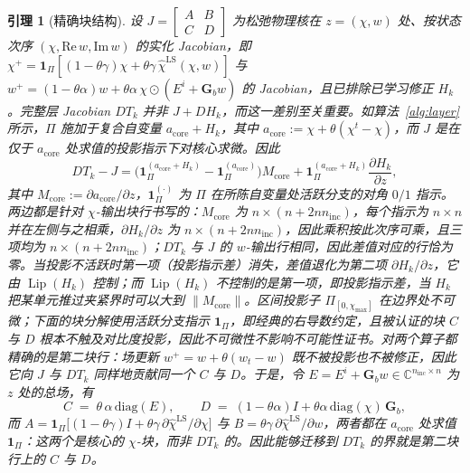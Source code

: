 \documentclass[UTF8,a4paper,11pt]{ctexart}
\newcommand{\C}{\mathbb{C}}
\newcommand{\norm}[1]{\lVert #1 \rVert}
\newtheorem{Lemma}{引理}[section]
\begin{document}
\begin{Lemma}[精确块结构]\label{lem:blocks}
设 $J=\left[\begin{smallmatrix}A&B\\ C&D\end{smallmatrix}\right]$ 为\emph{松弛物理核}在
$z=(\chi,w)$ 处、按状态次序 $(\chi,\mathrm{Re}\,w,\mathrm{Im}\,w)$ 的实化 Jacobian，即
$\chi^{+}=\mathbf{1}_{\Pi}[(1-\theta\gamma)\chi+\theta\gamma\,\hat\chi^{\mathrm{LS}}(\chi,w)]$
与 $w^{+}=(1-\theta\alpha)w+\theta\alpha\,\chi\odot(E^{i}+\mathbf{G}_b w)$ 的 Jacobian，\emph{且已排除已学习修正 $H_k$}。完整层 Jacobian $DT_k$ \emph{并非} $J+DH_k$，而这一差别至关重要。如算法~\ref{alg:layer} 所示，$\Pi$ 施加于\emph{复合}自变量 $a_{\mathrm{core}}+H_k$，其中
$a_{\mathrm{core}}:=\chi+\theta(\chi^{t}-\chi)$，而 $J$ 是在仅于 $a_{\mathrm{core}}$ 处求值的投影指示下对核心求微。因此
\begin{equation}\label{eq:dTvsJ}
DT_k-J=\Big(\mathbf{1}_{\Pi}^{(a_{\mathrm{core}}+H_k)}-\mathbf{1}_{\Pi}^{(a_{\mathrm{core}})}\Big)M_{\mathrm{core}}+\mathbf{1}_{\Pi}^{(a_{\mathrm{core}}+H_k)}\frac{\partial H_k}{\partial z},
\end{equation}
其中 $M_{\mathrm{core}}:=\partial a_{\mathrm{core}}/\partial z$，$\mathbf{1}_{\Pi}^{(\cdot)}$ 为 $\Pi$ 在所陈自变量处活跃分支的对角 $0/1$ 指示。两边都是针对 $\chi$-输出块行书写的：$M_{\mathrm{core}}$ 为 $n\times(n+2nn_{\mathrm{inc}})$，每个指示为 $n\times n$ 并在左侧与之相乘，$\partial H_k/\partial z$ 为 $n\times(n+2nn_{\mathrm{inc}})$，因此乘积按此次序可乘，且三项均为 $n\times(n+2nn_{\mathrm{inc}})$；$DT_k$ 与 $J$ 的 $w$-输出行相同，因此差值对应的行恰为零。当投影不活跃时第一项（投影指示差）消失，差值退化为第二项 $\partial H_k/\partial z$，它由 $\operatorname{Lip}(H_k)$ 控制；而 $\operatorname{Lip}(H_k)$ \emph{不}控制的是第一项，即投影指示差，当 $H_k$ 把某单元推过夹紧界时可以大到 $\norm{M_{\mathrm{core}}}$。区间投影子 $\Pi_{[0,\chi_{\max}]}$ 在边界处不可微；下面的块分解使用活跃分支指示 $\mathbf{1}_{\Pi}$，即经典的右导数约定，且被认证的块 $C$ 与 $D$ 根本不触及对比度投影，因此不可微性不影响不可能性证书。对两个算子都\emph{精确}的是第二块行：场更新 $w^{+}=w+\theta(w_t-w)$ 既不被投影也不被修正，因此它向 $J$ 与 $DT_k$ 同样地贡献同一个 $C$ 与 $D$。于是，令
$E=E^i+\mathbf{G}_b w\in\C^{n_{\mathrm{inc}}\times n}$ 为 $z$ 处的总场，有
\begin{equation}\label{eq:blocks}
C \;=\; \theta\,\alpha\,\mathrm{diag}(E),\qquad
D \;=\; (1-\theta\alpha)I+\theta\alpha\,\mathrm{diag}(\chi)\,\mathbf{G}_b ,
\end{equation}
而 $A=\mathbf{1}_{\Pi}\big[(1-\theta\gamma)I+\theta\gamma\,
\partial\hat\chi^{\mathrm{LS}}/\partial\chi\big]$ 与
$B=\theta\gamma\,\partial\hat\chi^{\mathrm{LS}}/\partial w$，两者都在 $a_{\mathrm{core}}$ 处求值 $\mathbf{1}_{\Pi}$：这两个是\emph{核心}的 $\chi$-块，而非 $DT_k$ 的。因此能够迁移到 $DT_k$ 的界就是第二块行上的 $C$ 与 $D$。
\end{Lemma}
\end{document}
